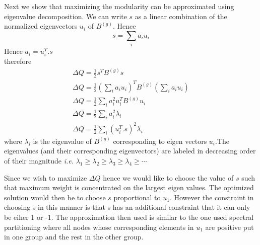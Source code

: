 \documentclass{sig-alternate}
\newcommand{\ie}{{\em i.e.}}
\begin{document}
Next we show that maximizing the modularity can be  approximated using eigenvalue decomposition.
We  can write $s$ as a linear combination of the normalized eigenvectors $u_i$  of  $B^{(g)}$.
Hence
\begin{equation}
\label{eq: mod20}
s=\sum_{i} a_{i} u_{i}
\end{equation}
Hence $a_{i} = u_{i}^{T}.s$ \\
therefore
\begin{eqnarray}
\label{eq: mod21}
\Delta Q= \frac{1}{2} s^{T}B^{(g)}s\\
\Delta Q= \frac{1}{2} {(\sum_{i} a_{i} u_{i})}^{T}B^{(g)}(\sum_{i} a_{i} u_{i})\\
\Delta Q= \frac{1}{2}\sum_{i} a_{i}^{2} u_{i}^{T}B^{(g)}u_{i}\\
\Delta Q= \frac{1}{2}\sum_{i} a_{i}^{2} \lambda_{i}\\
\Delta Q= \frac{1}{2}\sum_{i}(u_{i}^{T}.s )^{2} \lambda_{i}
\end{eqnarray}
where $ \lambda_{i}$ is the eigenvalue of $B^{(g)}$ corresponding to  eigen vectors $u_i$.The eigenvalues (and their corresponding eigenvectors) are labeled in decreasing order of their magnitude  \ie
$\lambda_{1} \geq \lambda_{2} \geq \lambda_{3} \geq \lambda_{4}  \geq \cdots $

Since we wish to maximize $\Delta Q$  hence we would like to choose the value of $s$ such that maximum weight is concentrated on the largest eigen values. The optimized solution would then be to choose $s$ proportional to $u_1$. However the constraint in choosing s in this manner is that s has an additional constraint that it can only  be eiher 1 or -1. The approximation then used is similar to the one used  spectral partitioning where all nodes whose corresponding elements in $u_1$  are positive put in one group and the rest in the other group.
\end{document}
